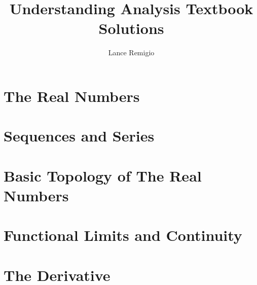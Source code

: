 \documentclass[12pt]{book}
\title{Understanding Analysis Textbook Solutions}
\author{Lance Remigio}
\begin{document}
\maketitle
\tableofcontents

\chapter{The Real Numbers}







\chapter{Sequences and Series}














\chapter{Basic Topology of The Real Numbers}








\chapter{Functional Limits and Continuity}











\chapter{The Derivative}
\end{document}
